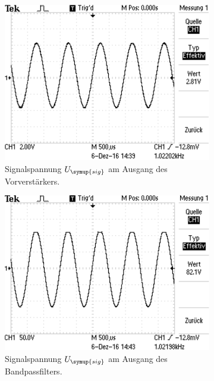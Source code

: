 \begin{figure}
  \begin{subfigure}{0.45\textwidth}
    \centering
    \includegraphics[width=\textwidth]{3.png}
    \caption{Signalspannung $U_{\symup{sig}}$ am Ausgang des Vorverstärkers.}
    \label{sub:3}
    \qquad
  \end{subfigure}
  \begin{subfigure}{0.45\textwidth}
    \centering
    \includegraphics[width=\textwidth]{4.png}
    \caption{Signalspannung $U_{\symup{sig}}$ am Ausgang des Bandpassfilters.}
    \label{sub:4}
    \qquad
  \end{subfigure} \\
  \begin{subfigure}{0.45\textwidth}

\end{subfigure}
\end{figure}
